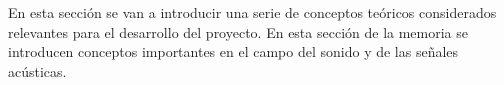 En esta sección se van a introducir una serie de conceptos teóricos considerados relevantes para el desarrollo del proyecto. En esta sección de la memoria se introducen conceptos importantes en el campo del sonido y de las señales acústicas.